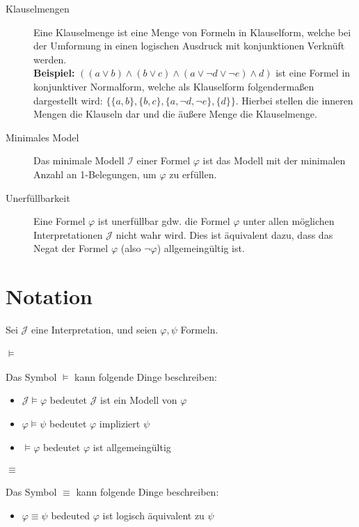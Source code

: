 \begin{description}
            \item[Klauselmengen] Eine Klauselmenge ist eine Menge von Formeln in Klauselform, welche bei der Umformung in einen logischen Ausdruck mit konjunktionen Verknüft werden. \\ \textbf{Beispiel:} $ ((a \lor b) \land (b \lor c) \land (a \lor \lnot d \lor \lnot e) \land d) $ ist eine Formel in konjunktiver Normalform, welche als Klauselform folgendermaßen dargestellt wird: $ \{ \{ a, b \}, \{ b, c \}, \{ a, \lnot d, \lnot e \}, \{ d \} \} $. Hierbei stellen die inneren Mengen die Klauseln dar und die äußere Menge die Klauselmenge.
            \item[Minimales Model] Das minimale Modell $ \mathcal{I} $ einer Formel $ \varphi $ ist das Modell mit der minimalen Anzahl an 1-Belegungen, um $ \varphi $ zu erfüllen.
            \item[Unerfüllbarkeit] Eine Formel $ \varphi $ ist unerfüllbar gdw. die Formel $ \varphi $ unter allen möglichen Interpretationen $ \mathcal{J} $ nicht wahr wird. Dies ist äquivalent dazu, dass das Negat der Formel $ \varphi $ (also $ \lnot \varphi $) allgemeingültig ist.
        \end{description}

    \section{Notation}
        Sei $ \mathcal{J} $ eine Interpretation, und seien $ \varphi, \psi $ Formeln.

        \paragraph{$ \models $}
            Das Symbol $ \models $ kann folgende Dinge beschreiben:
            \begin{itemize}
                \item $ \mathcal{J} \models \varphi $ bedeutet $ \mathcal{J} $ ist ein Modell von $ \varphi $
                \item $ \varphi \models \psi $ bedeutet $ \varphi $ impliziert $ \psi $
                \item $ \models \varphi $ bedeutet $ \varphi $ ist allgemeingültig
            \end{itemize}

        \paragraph{$ \equiv $}
            Das Symbol $ \equiv $ kann folgende Dinge beschreiben:
            \begin{itemize}
                \item $ \varphi \equiv \psi $ bedeuted $ \varphi $ ist logisch äquivalent zu $ \psi $
            \end{itemize}

